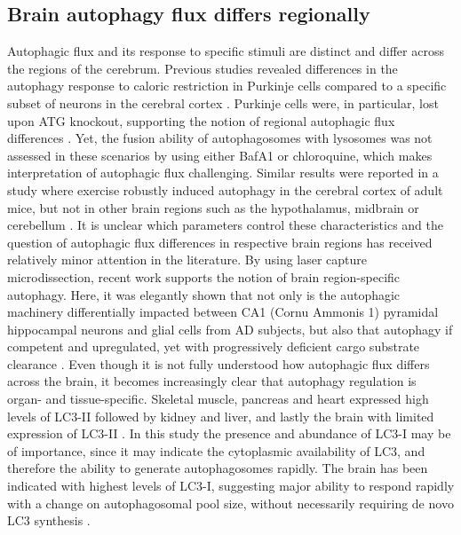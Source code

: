 \subsection{Brain autophagy flux differs regionally}
Autophagic flux and its response to specific stimuli are distinct and differ across the regions of the cerebrum. Previous studies revealed differences in the autophagy response to caloric restriction in Purkinje cells compared to a specific subset of neurons in the cerebral cortex \citep{Alirezaei2010}. Purkinje cells were, in particular, lost upon ATG knockout, supporting the notion of regional autophagic flux differences \citep{Alirezaei2010,Hara2006,Komatsu2006}. Yet, the fusion ability of autophagosomes with lysosomes was not assessed in these scenarios by using either BafA1 or chloroquine, which makes interpretation of autophagic flux challenging. Similar results were reported in a study where exercise robustly induced autophagy in the cerebral cortex of adult mice, but not in other brain regions such as the hypothalamus, midbrain or cerebellum \citep{He2012}. It is unclear which parameters control these characteristics and the question of autophagic flux differences in respective brain regions has received relatively minor attention in the literature. By using laser capture microdissection, recent work supports the notion of brain region-specific autophagy. Here, it was elegantly shown that not only is the autophagic machinery differentially impacted between CA1 (Cornu Ammonis 1) pyramidal hippocampal neurons and glial cells from AD subjects, but also that autophagy if competent and upregulated, yet with progressively deficient cargo substrate clearance \citep{Bordi2016}. Even though it is not fully understood how autophagic flux differs across the brain, it becomes increasingly clear that autophagy regulation is organ- and tissue-specific. Skeletal muscle, pancreas and heart expressed high levels of LC3-II followed by kidney and liver, and lastly the brain with limited expression of LC3-II \citep{Mizushima2004a}. In this study the presence and abundance of LC3-I may be of importance, since it may indicate the cytoplasmic availability of LC3, and therefore the ability to generate autophagosomes rapidly. The brain has been indicated with highest levels of LC3-I, suggesting major ability to respond rapidly with a change on autophagosomal pool size, without necessarily requiring de novo LC3 synthesis \citep{Mizushima2004a}.

